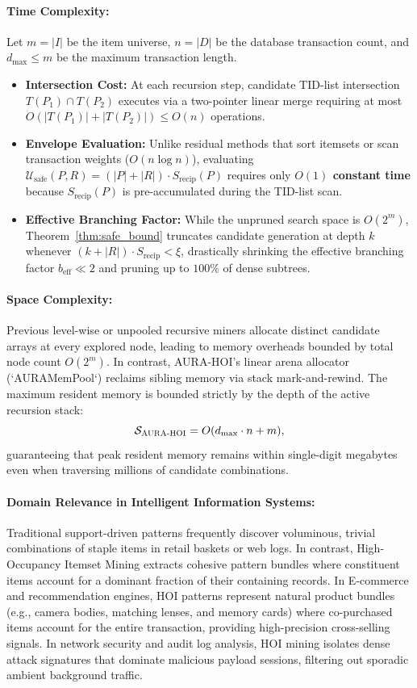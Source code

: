 \documentclass[runningheads,orivec]{llncs}
\newcommand{\AURA}{\textsc{AURA-HOI}}
\begin{document}
\paragraph{Time Complexity:}
Let $m = |I|$ be the item universe, $n = |D|$ be the database transaction count, and $d_{\max} \le m$ be the maximum transaction length.
\begin{itemize}
    \item \textbf{Intersection Cost:} At each recursion step, candidate TID-list intersection $T(P_1) \cap T(P_2)$ executes via a two-pointer linear merge requiring at most $O(|T(P_1)| + |T(P_2)|) \le O(n)$ operations.
    \item \textbf{Envelope Evaluation:} Unlike residual methods that sort itemsets or scan transaction weights ($O(n \log n)$), evaluating $\mathcal{U}_{\mathrm{safe}}(P, R) = (|P| + |R|) \cdot S_{\mathrm{recip}}(P)$ requires only \textbf{$O(1)$ constant time} because $S_{\mathrm{recip}}(P)$ is pre-accumulated during the TID-list scan.
    \item \textbf{Effective Branching Factor:} While the unpruned search space is $O(2^m)$, Theorem~\ref{thm:safe_bound} truncates candidate generation at depth $k$ whenever $(k + |R|) \cdot S_{\mathrm{recip}} < \xi$, drastically shrinking the effective branching factor $b_{\mathrm{eff}} \ll 2$ and pruning up to $100\%$ of dense subtrees.
\end{itemize}

\paragraph{Space Complexity:}
Previous level-wise or unpooled recursive miners allocate distinct candidate arrays at every explored node, leading to memory overheads bounded by total node count $O(2^m)$. In contrast, \AURA's linear arena allocator (`AURAMemPool`) reclaims sibling memory via stack mark-and-rewind. The maximum resident memory is bounded strictly by the depth of the active recursion stack:
\begin{equation}
\mathcal{S}_{\AURA} = O(d_{\max} \cdot n + m),
\end{equation}
guaranteeing that peak resident memory remains within single-digit megabytes even when traversing millions of candidate combinations.

\paragraph{Domain Relevance in Intelligent Information Systems:}
Traditional support-driven patterns frequently discover voluminous, trivial combinations of staple items in retail baskets or web logs. In contrast, High-Occupancy Itemset Mining extracts cohesive pattern bundles where constituent items account for a dominant fraction of their containing records. In E-commerce and recommendation engines, HOI patterns represent natural product bundles (e.g., camera bodies, matching lenses, and memory cards) where co-purchased items account for the entire transaction, providing high-precision cross-selling signals. In network security and audit log analysis, HOI mining isolates dense attack signatures that dominate malicious payload sessions, filtering out sporadic ambient background traffic.
\end{document}
